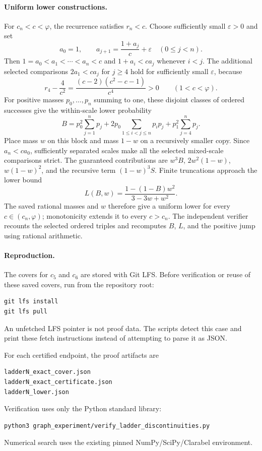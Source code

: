 \documentclass[11pt]{article}
\begin{document}
\paragraph{Uniform lower constructions.}
For $c_n<c<\varphi$, the recurrence satisfies $r_n<c$. Choose sufficiently
small $\varepsilon>0$ and set
\[
a_0=1,\qquad a_{j+1}=\frac{1+a_j}{c}+\varepsilon
\quad(0\le j<n).
\]
Then $1=a_0<a_1<\cdots<a_n<c$ and $1+a_i<ca_j$ whenever $i<j$.
The additional selected comparisons $2a_1<ca_j$ for $j\ge4$ hold for
sufficiently small $\varepsilon$, because
\[
r_4-\frac4{c^2}
=\frac{(c-2)(c^2-c-1)}{c^4}>0\qquad(1<c<\varphi).
\]
For positive masses $p_0,\ldots,p_n$ summing to one, these disjoint classes
of ordered successes give the within-scale lower probability
\[
B=p_0^2\sum_{j=1}^n p_j
+2p_0\sum_{1\le i<j\le n}p_i p_j
+p_1^2\sum_{j=4}^n p_j.
\]
Place mass $w$ on this block and mass $1-w$ on a recursively smaller copy.
Since $a_n<c a_0$, sufficiently separated scales make all the selected
mixed-scale comparisons strict. The guaranteed contributions are
$w^3B$, $2w^2(1-w)$, $w(1-w)^2$, and the recursive term $(1-w)^3S$.
Finite truncations approach the lower bound
\[
L(B,w)=\frac{1-(1-B)w^2}{3-3w+w^2}.
\]
The saved rational masses and $w$ therefore give a uniform lower for every
$c\in(c_n,\varphi)$; monotonicity extends it to every $c>c_n$.
The independent verifier recounts the selected ordered triples and
recomputes $B$, $L$, and the positive jump using rational arithmetic.

\paragraph{Reproduction.}
The covers for $c_5$ and $c_6$ are stored with Git LFS.
Before verification or reuse of these saved covers, run from the repository root:
\begin{verbatim}
git lfs install
git lfs pull
\end{verbatim}
An unfetched LFS pointer is not proof data. The scripts detect this case
and print these fetch instructions instead of attempting to parse it as JSON.

For each certified endpoint, the proof artifacts are
\begin{verbatim}
ladderN_exact_cover.json
ladderN_exact_certificate.json
ladderN_lower.json
\end{verbatim}
Verification uses only the Python standard library:
\begin{verbatim}
python3 graph_experiment/verify_ladder_discontinuities.py
\end{verbatim}
Numerical search uses the existing pinned NumPy/SciPy/Clarabel environment.
\end{document}
